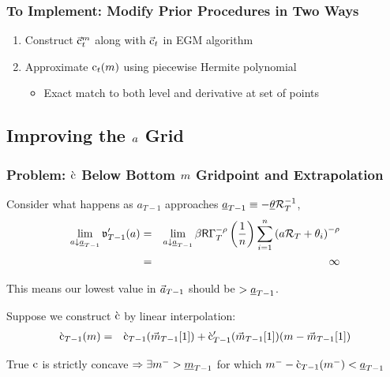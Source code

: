 \documentclass{beamer}
\begin{document}
\begin{frame}
\frametitle{To Implement: Modify Prior Procedures in Two Ways}
\begin{enumerate}
\item Construct $\vec{\mathrm{c}}^{m}_{t}$ along with $\vec{\mathrm{c}}_{t}$ in EGM algorithm
\item Approximate $\mathrm{c}_{t}(m)$ using piecewise Hermite polynomial
\begin{itemize}
\item Exact match to both level and derivative at set of points
\end{itemize}
\end{enumerate}
\end{frame}


\subsection{Improving the $a$ Grid}

\begin{frame}
\frametitle{Problem: $\grave{\mathrm{c}}$ Below Bottom $m$ Gridpoint and Extrapolation}

Consider what happens as ${a}_{T-1}$ approaches $\underline{a}_{T-1}\equiv-\underline{\theta}\mathcal{R}_{T}^{-1}$,
\begin{eqnarray*}
        \lim_{{a} \downarrow \underline{a}_{T-1}} \mathfrak{v}_{T-1}^{\prime}({a}) & = &
        \lim_{{a} \downarrow \underline{a}_{T-1}} \beta \mathsf{R} \Gamma_{T}^{-\rho} \left(\frac{1}{n}\right) \sum_{i=1}^{n} \left( {a} \mathcal{R}_{T}+ \theta_{i}\right)^{-\rho}
\\ & = & \infty
\end{eqnarray*}

This means our lowest value in $\vec{a}_{T-1}$ should be $> \underline{a}_{T-1}$.  

\medskip
Suppose we construct $\grave{\mathrm{c}}$ by linear interpolation:
\begin{eqnarray*}
  \grave{\mathrm{c}}_{T-1}(m) &  = & \grave{\mathrm{c}}_{T-1}(\vec{m}_{T-1}[1])+\grave{\mathrm{c}}_{T-1}^{\prime}(\vec{m}_{T-1}[1])({m}-\vec{m}_{T-1}[1]) \label{eq:ExtrapLin}
\end{eqnarray*}

True $\mathrm{c}$ is strictly concave 
$\Rightarrow \exists m^{-} > \underline{m}_{T-1}$  for which $m^{-}-\grave{\mathrm{c}}_{T-1}(m^{-}) < \underline{a}_{T-1}$

\end{frame}
\end{document}
